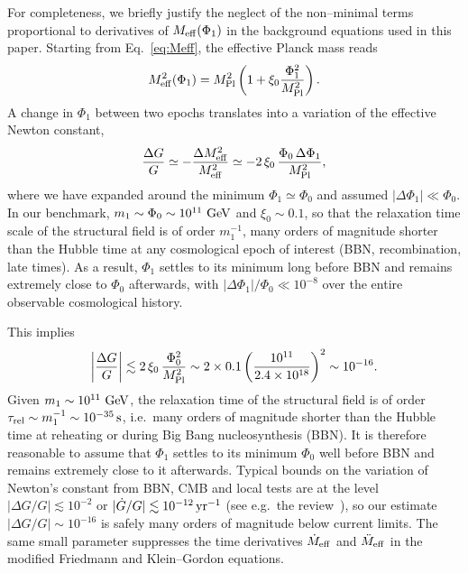 \documentclass[aps,prd,onecolumn,nofootinbib,superscriptaddress]{revtex4-2}
\begin{document}
For completeness, we briefly justify the neglect of the non--minimal terms proportional to derivatives of $M_{\rm eff}(\Phi_1)$ in the background equations used in this paper. Starting from Eq.~\eqref{eq:Meff}, the effective Planck mass reads
\begin{equation}
  M_{\rm eff}^2(\Phi_1) = M_{\rm Pl}^2\left(1 + \xi_0 \frac{\Phi_1^2}{M_{\rm Pl}^2}\right).
\end{equation}
A change in $\Phi_1$ between two epochs translates into a variation of the effective Newton constant,
\begin{equation}
  \frac{\Delta G}{G}
  \simeq - \frac{\Delta M_{\rm eff}^2}{M_{\rm eff}^2}
  \simeq - 2\,\xi_0\,\frac{\Phi_0\,\Delta\Phi_1}{M_{\rm Pl}^2},
\end{equation}
where we have expanded around the minimum $\Phi_1 \simeq \Phi_0$ and assumed $|\Delta\Phi_1|\ll \Phi_0$. In our benchmark, $m_1 \sim \Phi_0 \sim 10^{11}~{\rm GeV}$ and $\xi_0 \sim 0.1$, so that the relaxation time scale of the structural field is of order $m_1^{-1}$, many orders of magnitude shorter than the Hubble time at any cosmological epoch of interest (BBN, recombination, late times). As a result, $\Phi_1$ settles to its minimum long before BBN and remains extremely close to $\Phi_0$ afterwards, with $|\Delta\Phi_1|/\Phi_0 \ll 10^{-8}$ over the entire observable cosmological history.

This implies
\begin{equation}
  \left|\frac{\Delta G}{G}\right|
  \lesssim 2\,\xi_0\,\frac{\Phi_0^2}{M_{\rm Pl}^2}
  \sim 2\times 0.1 \left(\frac{10^{11}}{2.4\times 10^{18}}\right)^2
  \sim 10^{-16}.
\end{equation}
Given $m_1 \sim 10^{11}~{\rm GeV}$, the relaxation time of the structural field is of order
$\tau_{\rm rel} \sim m_1^{-1} \sim 10^{-35}\,{\rm s}$, i.e.\ many orders of magnitude shorter
than the Hubble time at reheating or during Big Bang nucleosynthesis (BBN).
It is therefore reasonable to assume that $\Phi_1$ settles to its minimum $\Phi_0$ well before BBN and remains extremely close to it afterwards.
Typical bounds on the variation of Newton's constant from BBN, CMB and local tests are at the level $|\Delta G/G| \lesssim 10^{-2}$ or $|\dot G/G|\lesssim 10^{-12}\,{\rm yr}^{-1}$ (see e.g.\ the review~\cite{Uzan2011}), so our estimate $|\Delta G/G|\sim 10^{-16}$ is safely many orders of magnitude below current limits.
The same small parameter suppresses the time derivatives $\dot M_{\rm eff}$ and $\ddot M_{\rm eff}$ in the modified Friedmann and Klein--Gordon equations.
\end{document}
